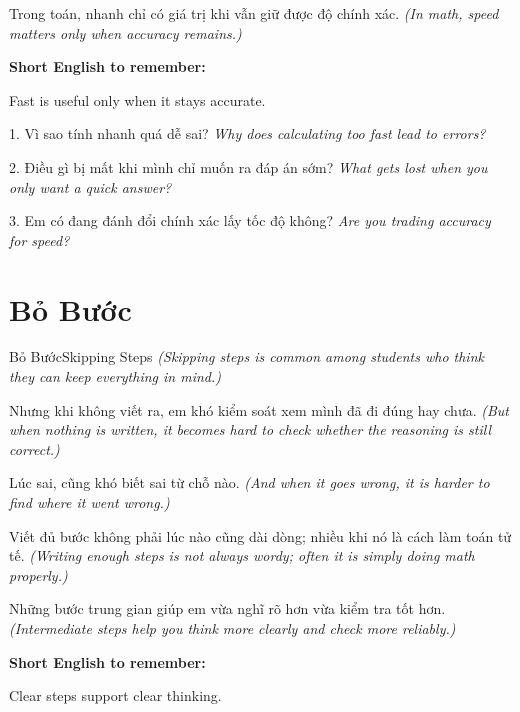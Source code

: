 \begin{baihoc}
Trong toán, nhanh chỉ có giá trị khi vẫn giữ được độ chính xác.
\textit{(In math, speed matters only when accuracy remains.)}
\end{baihoc}

\begin{ghinhoanh}
\textbf{Short English to remember:}

Fast is useful only when it stays accurate.

\end{ghinhoanh}

\begin{tuhocnhanh}
1. Vì sao tính nhanh quá dễ sai? \textit{Why does calculating too fast lead to errors?}

2. Điều gì bị mất khi mình chỉ muốn ra đáp án sớm? \textit{What gets lost when you only want a quick answer?}

3. Em có đang đánh đổi chính xác lấy tốc độ không? \textit{Are you trading accuracy for speed?}
\end{tuhocnhanh}
\ngancach

\section{Bỏ Bước}
\begin{truyen}{Bỏ Bước}{Skipping Steps}
\textit{(Skipping steps is common among students who think they can keep everything in mind.)}

Nhưng khi không viết ra, em khó kiểm soát xem mình đã đi đúng hay chưa.
\textit{(But when nothing is written, it becomes hard to check whether the reasoning is still correct.)}

Lúc sai, cũng khó biết sai từ chỗ nào.
\textit{(And when it goes wrong, it is harder to find where it went wrong.)}

Viết đủ bước không phải lúc nào cũng dài dòng; nhiều khi nó là cách làm toán tử tế.
\textit{(Writing enough steps is not always wordy; often it is simply doing math properly.)}
\end{truyen}

\begin{baihoc}
Những bước trung gian giúp em vừa nghĩ rõ hơn vừa kiểm tra tốt hơn.
\textit{(Intermediate steps help you think more clearly and check more reliably.)}
\end{baihoc}

\begin{ghinhoanh}
\textbf{Short English to remember:}

Clear steps support clear thinking.

\end{ghinhoanh}

